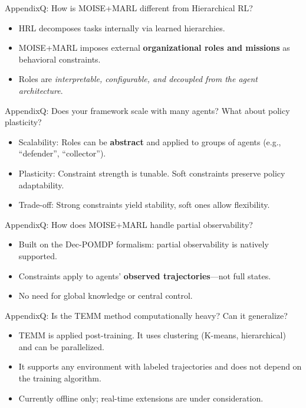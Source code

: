 \begin{frame}{Appendix}{Q: How is MOISE+MARL different from Hierarchical RL?}
    \begin{itemize}
        \item HRL decomposes tasks internally via learned hierarchies.
        \item MOISE+MARL imposes external \textbf{organizational roles and missions} as behavioral constraints.
        \item Roles are \textit{interpretable, configurable, and decoupled from the agent architecture}.
    \end{itemize}
\end{frame}

\begin{frame}{Appendix}{Q: Does your framework scale with many agents? What about policy plasticity?}
    \begin{itemize}
        \item Scalability: Roles can be \textbf{abstract} and applied to groups of agents (e.g., “defender”, “collector”).
        \item Plasticity: Constraint strength is tunable. Soft constraints preserve policy adaptability.
        \item Trade-off: Strong constraints yield stability, soft ones allow flexibility.
    \end{itemize}
\end{frame}

\begin{frame}{Appendix}{Q: How does MOISE+MARL handle partial observability?}
    \begin{itemize}
        \item Built on the Dec-POMDP formalism: partial observability is natively supported.
        \item Constraints apply to agents' \textbf{observed trajectories}—not full states.
        \item No need for global knowledge or central control.
    \end{itemize}
\end{frame}

\begin{frame}{Appendix}{Q: Is the TEMM method computationally heavy? Can it generalize?}
    \begin{itemize}
        \item TEMM is applied post-training. It uses clustering (K-means, hierarchical) and can be parallelized.
        \item It supports any environment with labeled trajectories and does not depend on the training algorithm.
        \item Currently offline only; real-time extensions are under consideration.
    \end{itemize}
\end{frame}

